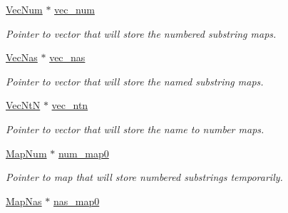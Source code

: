 \begin{DoxyCompactItemize}
\hypertarget{classjpcre2_1_1RegexMatch_a836705e0444568c78abaab4c8e351335}{}\label{classjpcre2_1_1RegexMatch_a836705e0444568c78abaab4c8e351335} 
\hyperlink{namespacejpcre2_ac1cf752c8fbb0be78020be3b80e77ce3}{Vec\+Num} $\ast$ \hyperlink{classjpcre2_1_1RegexMatch_a836705e0444568c78abaab4c8e351335}{vec\+\_\+num}
\begin{DoxyCompactList}\small\item\em Pointer to vector that will store the numbered substring maps. \end{DoxyCompactList}\item 
\hypertarget{classjpcre2_1_1RegexMatch_a812b57dc08fdc0caa93a1b508ef8242c}{}\label{classjpcre2_1_1RegexMatch_a812b57dc08fdc0caa93a1b508ef8242c} 
\hyperlink{namespacejpcre2_a2b121ae776ea5b2913839f418a7d856b}{Vec\+Nas} $\ast$ \hyperlink{classjpcre2_1_1RegexMatch_a812b57dc08fdc0caa93a1b508ef8242c}{vec\+\_\+nas}
\begin{DoxyCompactList}\small\item\em Pointer to vector that will store the named substring maps. \end{DoxyCompactList}\item 
\hypertarget{classjpcre2_1_1RegexMatch_a86ef413ab6d237972af858be26ff77f7}{}\label{classjpcre2_1_1RegexMatch_a86ef413ab6d237972af858be26ff77f7} 
\hyperlink{namespacejpcre2_a88a7aaf84cad627d34c8152e726168eb}{Vec\+NtN} $\ast$ \hyperlink{classjpcre2_1_1RegexMatch_a86ef413ab6d237972af858be26ff77f7}{vec\+\_\+ntn}
\begin{DoxyCompactList}\small\item\em Pointer to vector that will store the name to number maps. \end{DoxyCompactList}\item 
\hypertarget{classjpcre2_1_1RegexMatch_a94ad930ea8cb22873737fda344bae508}{}\label{classjpcre2_1_1RegexMatch_a94ad930ea8cb22873737fda344bae508} 
\hyperlink{namespacejpcre2_a947e37f0e4a1678157e7f1f855638e82}{Map\+Num} $\ast$ \hyperlink{classjpcre2_1_1RegexMatch_a94ad930ea8cb22873737fda344bae508}{num\+\_\+map0}
\begin{DoxyCompactList}\small\item\em Pointer to map that will store numbered substrings temporarily. \end{DoxyCompactList}\item 
\hypertarget{classjpcre2_1_1RegexMatch_a36749947847f266de03c3991ac88a694}{}\label{classjpcre2_1_1RegexMatch_a36749947847f266de03c3991ac88a694} 
\hyperlink{namespacejpcre2_a20bd901c9ca3c949806aa6b9e324f6cf}{Map\+Nas} $\ast$ \hyperlink{classjpcre2_1_1RegexMatch_a36749947847f266de03c3991ac88a694}{nas\+\_\+map0}

\end{DoxyCompactItemize}
